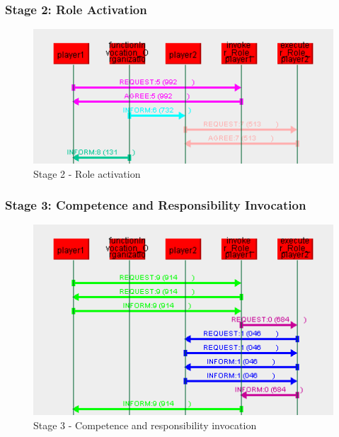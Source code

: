 \subsubsection*{Stage 2: Role Activation}

\begin{figure}[H]
	\centering
	\includegraphics[width=\textwidth]{images/example1-stage2.png}
	\caption{Stage 2 - Role activation}
	\label{figure:example1-stage2}
\end{figure}

\subsubsection*{Stage 3: Competence and Responsibility Invocation}

\begin{figure}[H]
	\centering
	\includegraphics[width=\textwidth]{images/example1-stage3.png}
	\caption{Stage 3 - Competence and responsibility invocation}
	\label{figure:example1-stage3}
\end{figure}

